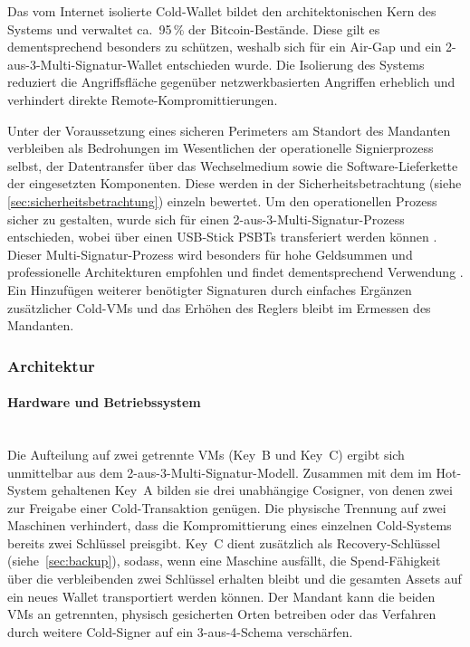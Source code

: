 Das vom Internet isolierte Cold-Wallet bildet den architektonischen Kern des Systems und verwaltet ca.\ 95\,\% der Bitcoin-Bestände. Diese gilt es dementsprechend besonders zu schützen, weshalb sich für ein Air-Gap und ein 2-aus-3-Multi-Signatur-Wallet entschieden wurde. Die Isolierung des Systems reduziert die Angriffsfläche gegenüber netzwerkbasierten Angriffen erheblich und verhindert direkte Remote-Kompromittierungen.

Unter der Voraussetzung eines sicheren Perimeters am Standort des Mandanten verbleiben als Bedrohungen im Wesentlichen der operationelle Signierprozess selbst, der Datentransfer über das Wechselmedium sowie die Software-Lieferkette der eingesetzten Komponenten. Diese werden in der Sicherheitsbetrachtung
(siehe \ref{sec:sicherheitsbetrachtung}) einzeln bewertet.
Um den operationellen Prozess sicher zu gestalten, wurde sich für einen 2-aus-3-Multi-Signatur-Prozess entschieden, wobei über einen \ac{USB}-Stick \acp{PSBT} transferiert werden können \cite{riskpublishing_hotcold,bip174,Sparrow_Wallets_Best_Practices,knowingbitcoin_hotcold,psbt_dcentral,airgap_psbt_guide}.
Dieser Multi-Signatur-Prozess wird besonders für hohe Geldsummen und professionelle Architekturen empfohlen und findet dementsprechend Verwendung \cite{Sparrow_Wallets_Best_Practices}. Ein Hinzufügen weiterer benötigter Signaturen durch einfaches Ergänzen zusätzlicher Cold-\acp{VM} und das Erhöhen des Reglers bleibt im Ermessen des Mandanten.

\subsubsection{Architektur}

\paragraph{Hardware und Betriebssystem} \mbox{}\\
Die Aufteilung auf zwei getrennte \acp{VM} (Key~B und Key~C) ergibt sich unmittelbar aus dem 2-aus-3-Multi-Signatur-Modell. Zusammen mit dem im Hot-System gehaltenen Key~A bilden sie drei unabhängige Cosigner, von denen zwei zur Freigabe einer Cold-Transaktion genügen. 
Die physische Trennung auf zwei Maschinen verhindert, dass die Kompromittierung eines einzelnen Cold-Systems bereits zwei Schlüssel preisgibt. Key~C dient zusätzlich als Recovery-Schlüssel (siehe~\ref{sec:backup}), sodass, wenn eine Maschine ausfällt, die Spend-Fähigkeit über die verbleibenden zwei Schlüssel erhalten bleibt und die gesamten Assets auf ein neues Wallet transportiert werden können. Der Mandant kann die beiden \acp{VM} an getrennten, physisch gesicherten Orten betreiben oder das Verfahren durch weitere Cold-Signer auf ein 3-aus-4-Schema verschärfen.


